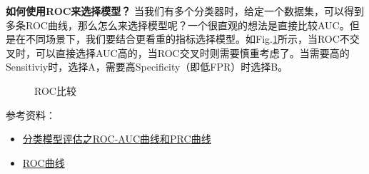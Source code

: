 \textbf{如何使用ROC来选择模型？}\newline
当我们有多个分类器时，给定一个数据集，可以得到多条ROC曲线，那么怎么来选择模型呢？一个很直观的想法是直接比较AUC。但是在不同场景下，我们要结合更看重的指标选择模型。如Fig.\ref{fig:roc-cmp}所示，当ROC不交叉时，可以直接选择AUC高的，当ROC交叉时则需要慎重考虑了。当需要高的Sensitiviy时，选择A，需要高Specificity（即低FPR）时选择B。


\begin{figure}[h]
	\centering
	\quad
	\caption{ROC比较}
	\label{fig:roc-cmp}
\end{figure}

参考资料：
\begin{itemize}
	\item \href{https://blog.csdn.net/pipisorry/article/details/51788927}{分类模型评估之ROC-AUC曲线和PRC曲线}
	\item \href{https://zh.wikipedia.org/zh/ROC%E6%9B%B2%E7%BA%BF}{ROC曲线}
\end{itemize}


